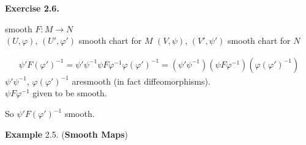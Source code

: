 \documentclass[11pt]{amsart}
\theoremstyle{definition}
\newcommand{\exercisehead}[1]{\medskip\noindent\textbf{Exercise #1.} }
\begin{document}
\exercisehead{2.6}

smooth $F: M \to N$  \\
$(U,\varphi)$, $(U',\varphi')$ smooth chart for $M$
$(V,\psi)$, $(V',\psi')$ smooth chart for $N$

\[
\begin{gathered}
  \psi' F(\varphi')^{-1} = \psi' \psi^{-1} \psi F \varphi^{-1} \varphi (\varphi')^{-1} = (\psi' \psi^{-1}) ( \psi F \varphi^{-1})(\varphi (\varphi')^{-1})
\end{gathered}
\]
$\psi' \psi^{-1}$, $\varphi (\varphi')^{-1}$ aresmooth (in fact diffeomorphisms).  \\
$\psi F \varphi^{-1}$ given to be smooth.

So $\psi' F(\varphi')^{-1}$ smooth.


\textbf{Example} 2.5. (\textbf{Smooth Maps})
\end{document}
